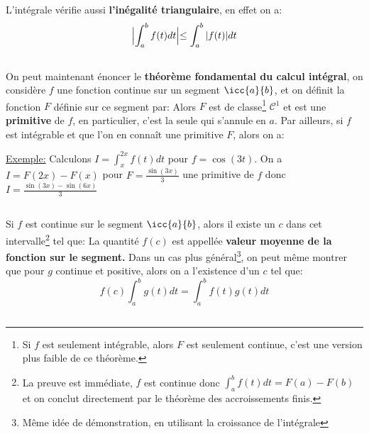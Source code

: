 L'intégrale vérifie aussi \textbf{l'inégalité triangulaire}, en effet on a:
\[ 
   \Bigl| \int_{a}^{b} f(t) d t \Bigl| \leq \int_{a}^{b} |f(t)| d t 
\]
\subsection*{}

On peut maintenant énoncer le \textbf{théorème fondamental du calcul intégral}, on considère \(f\) une fonction continue sur un segment \(\icc{a}{b}\), et on définit la fonction \(F\) définie sur ce segment par:
Alors \(F\) est de classe\footnote[4]{Si \(f\) est seulement intégrable, alors \(F\) est seulement continue, c'est une version plus faible de ce théorème.} \(\mathscr{C}^1\) et est une \textbf{primitive} de \(f\), en particulier, c'est la seule qui s'annule en \(a\).\+
Par ailleurs, si \(f\) est intégrable et que l'on en connaît une primitive \(F\), alors on a:

\underline{Exemple:} Calculons \(I = \int_{x}^{2x} f(t) d t\) pour \(f = \cos(3t)\). On a \(I = F(2x) - F(x)\) pour \(F = \frac{\sin(3x)}{3}\) une primitive de \(f\) donc \(I = \frac{\sin(3x) - \sin(6x)}{3}\)
\subsection*{}
Si \(f\) est continue sur le segment \(\icc{a}{b}\), alors il existe un \(c\) dans cet intervalle\footnote[1]{La preuve est immédiate, \(f\) est continue donc \(\int_{a}^{b} f(t) d t = F(a) - F(b)\) et on conclut directement par le théorème des accroissements finis.} tel que:
La quantité \(f(c)\) est appellée \textbf{valeur moyenne de la fonction sur le segment.}
Dans un cas plus général\footnote[2]{Même idée de démonstration, en utilisant la croissance de l'intégrale}, on peut même montrer que pour \(g\) continue et positive, alors on a l'existence d'un \(c\) tel que:
\[
   f(c)\int_{a}^{b} g(t) d t = \int_{a}^{b} f(t)g(t) d t
\]
\subsection*{}


